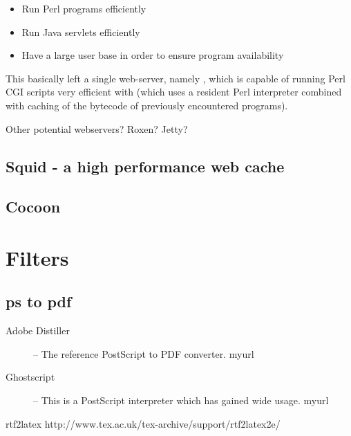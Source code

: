 \begin{itemize}
\item Run Perl programs efficiently
\item Run Java servlets efficiently
\item Have a large user base in order to ensure program availability
\end{itemize}

This basically left a single web-server, namely
, which is capable of running
Perl CGI scripts very efficient with
 (which
uses a resident Perl interpreter combined with caching of the bytecode
of previously encountered programs).

\textsf{Other potential webservers?  Roxen?  Jetty?}


\subsection{Squid - a high performance web cache}
\label{sec:squid}



\subsection{Cocoon}
\label{sec:cocoon}



\section{Filters}
\label{sec:cactus-filters}


\subsection{ps to pdf}
\label{sec:filter-ps-to-pdf}

\begin{description}
\item[Adobe Distiller] -- The reference PostScript to PDF converter.
  \textsf{myurl}
\item[Ghostscript] -- This is a PostScript interpreter which has gained
  wide usage.  \textsf{myurl}
\end{description}
rtf2latex http://www.tex.ac.uk/tex-archive/support/rtf2latex2e/



